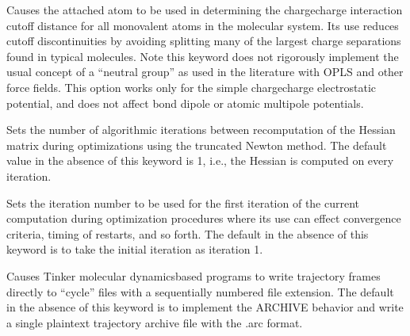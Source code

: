 \documentclass[letterpaper,11pt,english]{sphinxmanual}
\begin{document}
\ignorespaces {}\label{\detokenize{text/keywords:key-neutral-groups}}\begin{description}
\sphinxAtStartPar
Causes the attached atom to be used in determining the charge\sphinxhyphen{}charge interaction cutoff distance for all monovalent atoms in the molecular system. Its use reduces cutoff discontinuities by avoiding splitting many of the largest charge separations found in typical molecules. Note this keyword does not rigorously implement the usual concept of a “neutral group” as used in the literature with OPLS and other force fields. This option works only for the simple charge\sphinxhyphen{}charge electrostatic potential, and does not affect bond dipole or atomic multipole potentials.

\end{description}

\ignorespaces {}\label{\detokenize{text/keywords:key-newhess}}\begin{description}
\sphinxAtStartPar
Sets the number of algorithmic iterations between recomputation of the Hessian matrix during optimizations using the truncated Newton method. The default value in the absence of this keyword is 1, i.e., the Hessian is computed on every iteration.

\end{description}

\ignorespaces {}\label{\detokenize{text/keywords:key-nextiter}}\begin{description}
\sphinxAtStartPar
Sets the iteration number to be used for the first iteration of the current computation during optimization procedures where its use can effect convergence criteria, timing of restarts, and so forth. The default in the absence of this keyword is to take the initial iteration as iteration 1.

\end{description}

\ignorespaces {}\label{\detokenize{text/keywords:key-noarchive}}\begin{description}
\sphinxAtStartPar
Causes Tinker molecular dynamics\sphinxhyphen{}based programs to write trajectory frames directly to “cycle” files with a sequentially numbered file extension. The default in the absence of this keyword is to implement the ARCHIVE behavior and write a single plain\sphinxhyphen{}text trajectory archive file with the .arc format.

\end{description}
\end{document}
